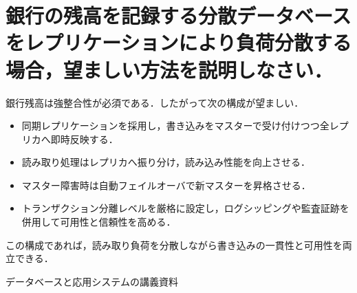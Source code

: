 \documentclass[titlepage,a4paper]{jsarticle}
\begin{document}
\section{銀行の残高を記録する分散データベースをレプリケーションにより負荷分散する場合，望ましい方法を説明しなさい．}
銀行残高は強整合性が必須である．したがって次の構成が望ましい．  

\begin{itemize}
  \item 同期レプリケーションを採用し，書き込みをマスターで受け付けつつ全レプリカへ即時反映する．
  \item 読み取り処理はレプリカへ振り分け，読み込み性能を向上させる．
  \item マスター障害時は自動フェイルオーバで新マスターを昇格させる．
  \item トランザクション分離レベルを厳格に設定し，ログシッピングや監査証跡を併用して可用性と信頼性を高める．
\end{itemize}

この構成であれば，読み取り負荷を分散しながら書き込みの一貫性と可用性を両立できる．

\begin{thebibliography}{99}
  \bibitem{}データベースと応用システムの講義資料
\end{thebibliography}
\end{document}

